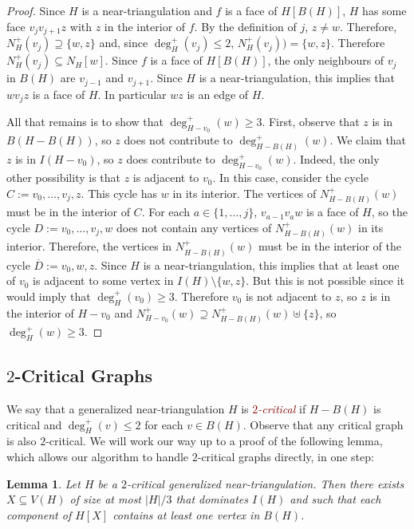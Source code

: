 \documentclass[12pt]{article}
\newtheorem{lem}{Lemma}
\newcommand{\defin}[1]{\emph{\textcolor{Maroon}{#1}}}
\theoremstyle{definition}
\begin{document}
\begin{proof}
  Since $H$ is a near-triangulation and $f$ is a face of $H[B(H)]$, $H$ has some face $v_j v_{j+1} z$ with $z$ in the interior of $f$.  By the definition of $j$, $z\neq w$.  Therefore, $N_H^+(v_j)\supseteq \{w,z\}$ and, since $\deg^+_H(v_j)\le 2$, $N_H^+(v_j))= \{w,z\}$.  Therefore $N^+_H(v_j)\subseteq N_H[w]$.  Since $f$ is a face of $H[B(H)]$, the only neighbours of $v_j$ in $B(H)$ are $v_{j-1}$ and $v_{j+1}$. Since $H$ is a near-triangulation, this implies that $w v_j z$ is a face of $H$.  In particular $wz$ is an edge of $H$.

  All that remains is to show that $\deg^+_{H-v_0}(w)\ge 3$.  First, observe that $z$ is in $B(H-B(H))$, so $z$ does not contribute to $\deg^+_{H-B(H)}(w)$. We claim that $z$ is in $I(H-v_0)$, so $z$ does contribute to $\deg^+_{H-v_0}(w)$.   Indeed, the only other possibility is that $z$ is adjacent to $v_0$.  In this case, consider the cycle $C:=v_0,\ldots,v_j,z$.  This cycle has $w$ in its interior. The vertices of $N^+_{H-B(H)}(w)$ must be in the interior of $C$. For each $a\in\{1,\ldots,j\}$, $v_{a-1}v_a w$ is a face of $H$, so the cycle $D:=v_0,\ldots,v_j,w$ does not contain any vertices of $N^+_{H-B(H)}(w)$ in its interior.  Therefore, the vertices in $N^+_{H-B(H)}(w)$ must be in the interior of the cycle $\overline{D}:=v_0,w,z$.  Since $H$ is a near-triangulation, this implies that at least one of $v_0$ is adjacent to some vertex in $I(H)\setminus\{w,z\}$. But this is not possible since it would imply that $\deg^+_H(v_0)\ge 3$.  Therefore $v_0$ is not adjacent to $z$, so $z$ is in the interior of $H-v_0$ and $N^+_{H-v_0}(w)\supseteq N^+_{H-B(H)}(w)\uplus\{z\}$, so $\deg^+_H(w)\ge 3$.
\end{proof}


\subsection{$2$-Critical Graphs}

We say that a generalized near-triangulation $H$ is \defin{$2$-critical} if $H-B(H)$ is critical and $\deg^+_H(v)\le 2$ for each $v\in B(H)$.  Observe that any critical graph is also $2$-critical.  We will work our way up to a proof of the following lemma, which allows our algorithm to handle $2$-critical graphs directly, in one step:

\begin{lem}\label{two_critical_handler}
  Let $H$ be a $2$-critical generalized near-triangulation.  Then there exists $X\subseteq V(H)$ of size at most $|H|/3$ that dominates $I(H)$ and such that each component of $H[X]$ contains at least one vertex in $B(H)$.
\end{lem}
\end{document}
